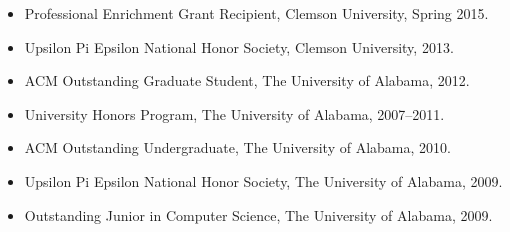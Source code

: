 \begin{itemize}[leftmargin=*]
  \item Professional Enrichment Grant Recipient, Clemson University, Spring
        2015.
  \item Upsilon Pi Epsilon National Honor Society, Clemson University, 2013.
  \item ACM Outstanding Graduate Student, The University of Alabama, 2012.
  \item University Honors Program, The University of Alabama, 2007--2011.
  \item ACM Outstanding Undergraduate, The University of Alabama, 2010.
  \item Upsilon Pi Epsilon National Honor Society, The University of Alabama, 2009.
  \item Outstanding Junior in Computer Science, The University of Alabama, 2009.
\end{itemize}
